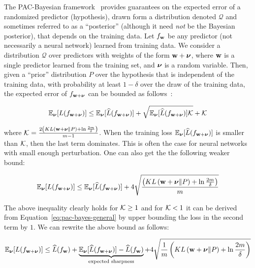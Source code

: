 \documentclass{article}
\begin{document}
The PAC-Bayesian framework~\cite{mcallester1998some,mcallester1999pac}
provides guarantees on the expected error of a randomized predictor
(hypothesis), drawn form a distribution denoted $\mathcal{Q}$ and
sometimes referred to as a ``posterior'' (although it need {\em not}
be the Bayesian posterior), that depends on the training data. Let $f_{\mathbf{w}}$
be any predictor (not necessarily a neural network) learned from training data.
We consider a distribution $\mathcal{Q}$ over predictors with
weights of the form $\mathbf{w}+\boldsymbol{\nu}$, where $\mathbf{w}$ is a single predictor
learned from the training set, and $\boldsymbol{\nu}$ is a random variable.  Then,
given a ``prior'' distribution $P$ over the hypothesis that is
independent of the training data, with probability at least $1-\delta$
over the draw of the training data, the expected error of
$f_{\mathbf{w}+\boldsymbol{\nu}}$ can be bounded as follows~\cite{mcallester2003simplified}:
\begin{small}
\begin{equation}\label{eq:pac-bayes-general}
\mathbb{E}_{\boldsymbol{\nu}} [L(f_{\mathbf{w}+\boldsymbol{\nu}})] \leq \mathbb{E}_{\boldsymbol{\nu}} [\widehat{L}(f_{\mathbf{w}+\boldsymbol{\nu}})] +\sqrt{\mathbb{E}_{\boldsymbol{\nu}} [\widehat{L}(f_{\mathbf{w}+\boldsymbol{\nu}})]\mathcal{K}}+\mathcal{K}
\end{equation}
\end{small}
where $\mathcal{K}=\frac{2\left(KL\left(\mathbf{w}+\boldsymbol{\nu}\|P\right)+\ln\frac{2m}{\delta}\right)}{m-1}$. When the training loss $\mathbb{E}_{\boldsymbol{\nu}} [\widehat{L}(f_{\mathbf{w}+\boldsymbol{\nu}})]$ is smaller than $\mathcal{K}$, then the last term dominates. This is often the case for neural networks with small enough perturbation. One can also get the the following weaker bound:
\begin{small}
\begin{equation}\label{eq:pac-bayes-simple}
\mathbb{E}_{\boldsymbol{\nu}} [L(f_{\mathbf{w}+\boldsymbol{\nu}})] \leq \mathbb{E}_{\boldsymbol{\nu}} [\widehat{L}(f_{\mathbf{w}+\boldsymbol{\nu}})] +4\sqrt{\frac{\left(KL\left(\mathbf{w}+\boldsymbol{\nu}\|P\right)+\ln\frac{2m}{\delta}\right)}{m}}
\end{equation}
\end{small}
The above inequality clearly holds for $\mathcal{K}\geq 1$ and for $\mathcal{K}<1$ it can be derived from Equation~\eqref{eq:pac-bayes-general} by upper bounding the loss in the second term by $1$. We can rewrite the above bound as follows:
\begin{small}
\begin{equation}
\mathbb{E}_{\boldsymbol{\nu}} [L(f_{\mathbf{w}+\boldsymbol{\nu}})] \leq \widehat{L}(f_{\mathbf{w}}) + \underbrace{\mathbb{E}_{\boldsymbol{\nu}} [\widehat{L}(f_{\mathbf{w}+\boldsymbol{\nu}})] -\widehat{L}(f_{\mathbf{w}})}_{\text{expected sharpness}} +4\sqrt{\frac{1}{m}\left(KL\left(\mathbf{w}+\boldsymbol{\nu}\|P\right)+\ln\frac{2m}{\delta}\right)}
\end{equation}
\label{eq:pacbayes}
\end{small}
\end{document}
